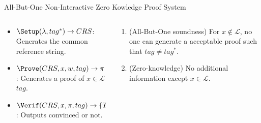 \begin{frame}{All-But-One Non-Interactive Zero Kowledge Proof System}
  

  \begin{columns}
    \begin{column}{0.5\textwidth}
      \begin{itemize}
      \item $\Setup(\lambda, tag^*) \to CRS$: Generates the common reference string.
      \item $\Prove(CRS, x, w, tag) \to \pi$: Generates a proof of $x \in \mathcal{L}$ \wrt $tag$.
      \item $\Verif(CRS, x, \pi, tag) \to \{True, False\}$: Outputs convinced or not.
      \end{itemize}
    \end{column}
    \pause
    \begin{column}{0.5\textwidth}
      \begin{enumerate}
      \item {\color{blue}(All-But-One soundness)} For $x \not \in \mathcal{L}$, no one can generate a acceptable proof such that $tag \neq tag^*$.
      \item {\color{blue}(Zero-knowledge)} No additional information except $x \in \mathcal{L}$.
      \end{enumerate}
    \end{column}
    
  \end{columns}
  
\end{frame}


